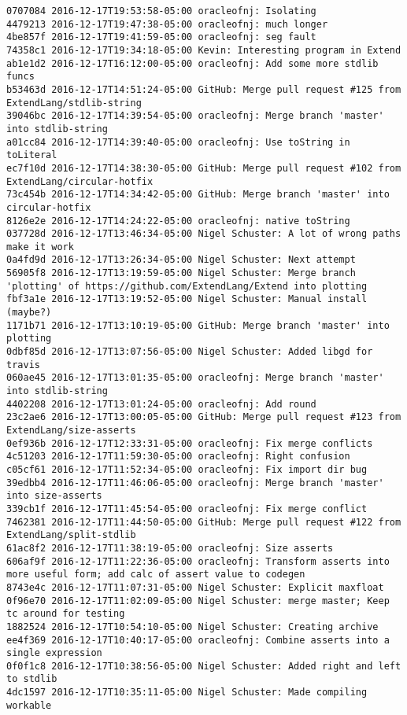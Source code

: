 \begin{lstlisting}
0707084 2016-12-17T19:53:58-05:00 oracleofnj: Isolating
4479213 2016-12-17T19:47:38-05:00 oracleofnj: much longer
4be857f 2016-12-17T19:41:59-05:00 oracleofnj: seg fault
74358c1 2016-12-17T19:34:18-05:00 Kevin: Interesting program in Extend
ab1e1d2 2016-12-17T16:12:00-05:00 oracleofnj: Add some more stdlib funcs
b53463d 2016-12-17T14:51:24-05:00 GitHub: Merge pull request #125 from ExtendLang/stdlib-string
39046bc 2016-12-17T14:39:54-05:00 oracleofnj: Merge branch 'master' into stdlib-string
a01cc84 2016-12-17T14:39:40-05:00 oracleofnj: Use toString in toLiteral
ec7f10d 2016-12-17T14:38:30-05:00 GitHub: Merge pull request #102 from ExtendLang/circular-hotfix
73c454b 2016-12-17T14:34:42-05:00 GitHub: Merge branch 'master' into circular-hotfix
8126e2e 2016-12-17T14:24:22-05:00 oracleofnj: native toString
037728d 2016-12-17T13:46:34-05:00 Nigel Schuster: A lot of wrong paths make it work
0a4fd9d 2016-12-17T13:26:34-05:00 Nigel Schuster: Next attempt
56905f8 2016-12-17T13:19:59-05:00 Nigel Schuster: Merge branch 'plotting' of https://github.com/ExtendLang/Extend into plotting
fbf3a1e 2016-12-17T13:19:52-05:00 Nigel Schuster: Manual install (maybe?)
1171b71 2016-12-17T13:10:19-05:00 GitHub: Merge branch 'master' into plotting
0dbf85d 2016-12-17T13:07:56-05:00 Nigel Schuster: Added libgd for travis
060ae45 2016-12-17T13:01:35-05:00 oracleofnj: Merge branch 'master' into stdlib-string
4402208 2016-12-17T13:01:24-05:00 oracleofnj: Add round
23c2ae6 2016-12-17T13:00:05-05:00 GitHub: Merge pull request #123 from ExtendLang/size-asserts
0ef936b 2016-12-17T12:33:31-05:00 oracleofnj: Fix merge conflicts
4c51203 2016-12-17T11:59:30-05:00 oracleofnj: Right confusion
c05cf61 2016-12-17T11:52:34-05:00 oracleofnj: Fix import dir bug
39edbb4 2016-12-17T11:46:06-05:00 oracleofnj: Merge branch 'master' into size-asserts
339cb1f 2016-12-17T11:45:54-05:00 oracleofnj: Fix merge conflict
7462381 2016-12-17T11:44:50-05:00 GitHub: Merge pull request #122 from ExtendLang/split-stdlib
61ac8f2 2016-12-17T11:38:19-05:00 oracleofnj: Size asserts
606af9f 2016-12-17T11:22:36-05:00 oracleofnj: Transform asserts into more useful form; add calc of assert value to codegen
8743e4c 2016-12-17T11:07:31-05:00 Nigel Schuster: Explicit maxfloat
0f96e70 2016-12-17T11:02:09-05:00 Nigel Schuster: merge master; Keep tc around for testing
1882524 2016-12-17T10:54:10-05:00 Nigel Schuster: Creating archive
ee4f369 2016-12-17T10:40:17-05:00 oracleofnj: Combine asserts into a single expression
0f0f1c8 2016-12-17T10:38:56-05:00 Nigel Schuster: Added right and left to stdlib
4dc1597 2016-12-17T10:35:11-05:00 Nigel Schuster: Made compiling workable

\end{lstlisting}

